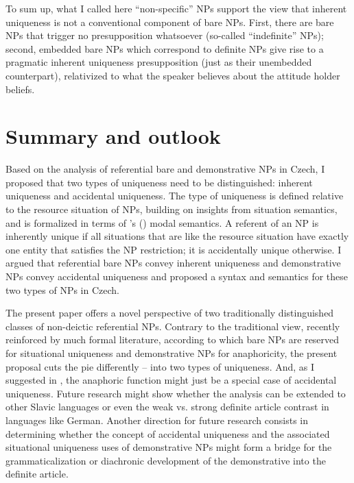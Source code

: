 \documentclass[output=paper,colorlinks,citecolor=brown,newtxmath]{langscibook}
\begin{document}
\noindent To sum up, what I called here ``non-specific'' NPs support the view that inherent uniqueness is not a conventional component of bare NPs. First, there are bare NPs that trigger no presupposition whatsoever (so-called ``indefinite'' NPs); second, embedded bare NPs which correspond to definite NPs give rise to a pragmatic inherent uniqueness presupposition (just as their unembedded counterpart), relativized to what the speaker believes about the attitude holder beliefs.

\section{Summary and outlook}\label{simik:sec:summary}

Based on the analysis of referential bare and demonstrative NPs in Czech, I proposed that two types of uniqueness need to be distinguished: inherent uniqueness and accidental uniqueness. The type of uniqueness is defined relative to the resource situation of NPs, building on insights from situation semantics, and is formalized in terms of \citeauthor{Kratzer1981}'s (\citeyear{Kratzer1981,Kratzer1991}) modal semantics. A referent of an NP is inherently unique if all situations that are like the resource situation have exactly one entity that satisfies the NP restriction; it is accidentally unique otherwise. I argued that referential bare NPs convey inherent uniqueness and demonstrative NPs convey accidental uniqueness and proposed a syntax and semantics for these two types of NPs in Czech.

The present paper offers a novel perspective of two traditionally distinguished classes of non-deictic referential NPs. Contrary to the traditional view, recently reinforced by much formal literature, according to which bare NPs are reserved for situational uniqueness and demonstrative NPs for anaphoricity, the present proposal cuts the pie differently -- into two types of uniqueness. And, as I suggested in , the anaphoric function might just be a special case of accidental uniqueness. Future research might show whether the analysis can be extended to other Slavic languages or even the weak vs. strong definite article contrast in languages like German. Another direction for future research consists in determining whether the concept of accidental uniqueness and the associated situational uniqueness uses of demonstrative NPs might form a bridge for the grammaticalization or diachronic development of the demonstrative into the definite article.
\end{document}
